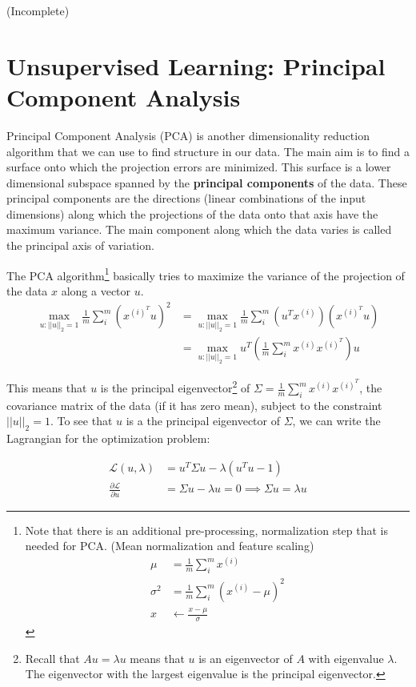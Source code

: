 \documentclass[letterpaper,10pt]{article}
\begin{document}
(Incomplete)


\section{Unsupervised Learning: Principal Component Analysis}

Principal Component Analysis (PCA) is another dimensionality reduction algorithm that we can use to find structure in our data. The main aim is to find a surface onto which the projection errors are minimized. This surface is a lower dimensional subspace spanned by the \textbf{principal components} of the data. These principal components are the directions (linear combinations of the input dimensions) along which the projections of the data onto that axis have the maximum variance. The main component along which the data varies is called the principal axis of variation.




The PCA algorithm\footnote{Note that there is an additional pre-processing, normalization step that is needed for PCA. (Mean normalization and feature scaling)
\begin{align}
\mu &= \frac{1}{m} \sum_i^m x^{(i)} \\
\sigma^2 &= \frac{1}{m} \sum_i^m (x^{(i)} - \mu)^2 \\
x &\leftarrow \frac{x-\mu}{\sigma}
\end{align}}
 basically tries to maximize the variance of the projection of the data $x$ along a vector $u$.
\begin{align}
\max_{u: ||u||_2 = 1} \frac{1}{m} \sum_{i}^m (x^{(i)^T}u)^2 &= \max_{u: ||u||_2 = 1} \frac{1}{m}  \sum_{i}^m (u^Tx^{(i)})(x^{(i)^T}u) \\
&= \max_{u: ||u||_2 = 1} u^T \left(\frac{1}{m}  \sum_{i}^m x^{(i)}x^{(i)^T} \right)u
\end{align}

This means that $u$ is the principal eigenvector\footnote{
Recall that $Au = \lambda u$ means that $u$ is an eigenvector of $A$ with eigenvalue $\lambda$. The eigenvector with the largest eigenvalue is the principal eigenvector.
} of $\Sigma =\frac{1}{m}  \sum_{i}^m x^{(i)}x^{(i)^T} $, the covariance matrix of the data (if it has zero mean), subject to the constraint $||u||_2=1$. To see that $u$ is a the principal eigenvector of $\Sigma$, we can write the Lagrangian for the optimization problem:

\begin{align}
\mathcal{L}(u,\lambda) &= u^T \Sigma u - \lambda (u^Tu - 1) \\
\frac{\partial \mathcal{L}}{\partial u} &= \Sigma u - \lambda u = 0 \implies \Sigma u = \lambda u
\end{align}
\end{document}
